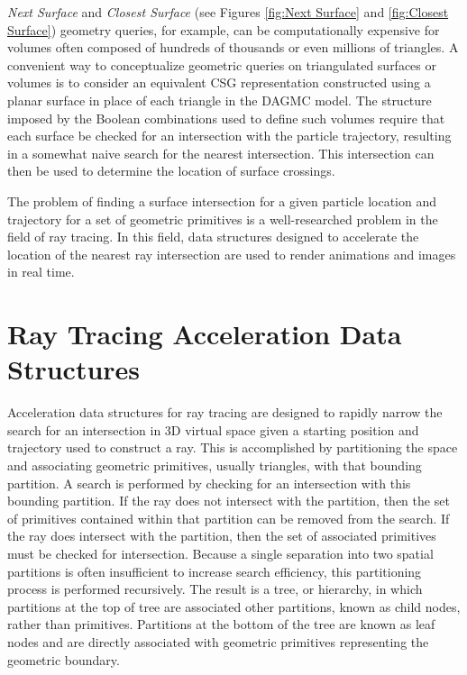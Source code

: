 \textit{Next Surface} and \textit{Closest Surface} (see Figures \ref{fig:Next
  Surface} and \ref{fig:Closest Surface}) geometry queries, for example, can be
computationally expensive for volumes often composed of hundreds of thousands or
even millions of triangles. A convenient way to conceptualize geometric queries
on triangulated surfaces or volumes is to consider an equivalent CSG
representation constructed using a planar surface in place of each triangle in
the DAGMC model. The structure imposed by the Boolean combinations used to
define such volumes require that each surface be checked for an intersection
with the particle trajectory, resulting in a somewhat naive search for the
nearest intersection. This intersection can then be used to
determine the location of surface crossings.

The problem of finding a surface intersection for a given particle location and
trajectory for a set of geometric primitives is a well-researched problem in
the field of ray tracing. In this field, data structures designed to accelerate
the location of the nearest ray intersection are used to render animations and
images in real time.

\section{Ray Tracing Acceleration Data Structures}

Acceleration data structures for ray tracing are designed to rapidly narrow the
search for an intersection in 3D virtual space given a starting position and
trajectory used to construct a ray. This is accomplished by partitioning the
space and associating geometric primitives, usually triangles, with that
bounding partition. A search is performed by checking for an intersection with
this bounding partition. If the ray does not intersect with the partition, then
the set of primitives contained within that partition can be removed from the
search. If the ray does intersect with the partition, then the set of associated
primitives must be checked for intersection. Because a single separation into
two spatial partitions is often insufficient to increase search efficiency, this
partitioning process is performed recursively. The result is a tree, or
hierarchy, in which partitions at the top of tree are associated other
partitions, known as child nodes, rather than primitives. Partitions at the
bottom of the tree are known as leaf nodes and are directly associated with
geometric primitives representing the geometric boundary.

